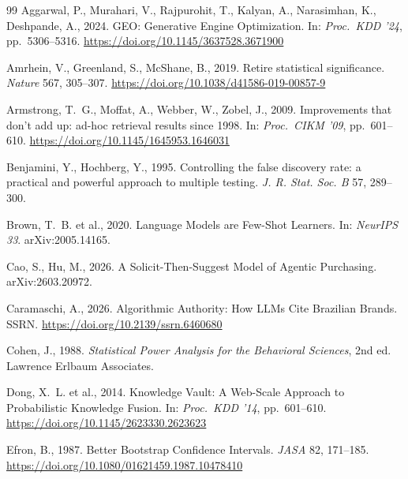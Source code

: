 \documentclass[preprint,12pt,authoryear]{elsarticle}
\begin{document}
\begin{thebibliography}{99}
Aggarwal, P., Murahari, V., Rajpurohit, T., Kalyan, A., Narasimhan, K., Deshpande, A., 2024. GEO: Generative Engine Optimization. In: \textit{Proc.\ KDD '24}, pp.~5306--5316. \url{https://doi.org/10.1145/3637528.3671900}

Amrhein, V., Greenland, S., McShane, B., 2019. Retire statistical significance. \textit{Nature} 567, 305--307. \url{https://doi.org/10.1038/d41586-019-00857-9}

Armstrong, T.~G., Moffat, A., Webber, W., Zobel, J., 2009. Improvements that don't add up: ad-hoc retrieval results since 1998. In: \textit{Proc.\ CIKM '09}, pp.~601--610. \url{https://doi.org/10.1145/1645953.1646031}

Benjamini, Y., Hochberg, Y., 1995. Controlling the false discovery rate: a practical and powerful approach to multiple testing. \textit{J. R. Stat. Soc. B} 57, 289--300.

Brown, T.~B. et al., 2020. Language Models are Few-Shot Learners. In: \textit{NeurIPS 33}. arXiv:2005.14165.

Cao, S., Hu, M., 2026. A Solicit-Then-Suggest Model of Agentic Purchasing. arXiv:2603.20972.

Caramaschi, A., 2026. Algorithmic Authority: How LLMs Cite Brazilian Brands. SSRN. \url{https://doi.org/10.2139/ssrn.6460680}

Cohen, J., 1988. \textit{Statistical Power Analysis for the Behavioral Sciences}, 2nd ed. Lawrence Erlbaum Associates.

Dong, X.~L. et al., 2014. Knowledge Vault: A Web-Scale Approach to Probabilistic Knowledge Fusion. In: \textit{Proc.\ KDD '14}, pp.~601--610. \url{https://doi.org/10.1145/2623330.2623623}

Efron, B., 1987. Better Bootstrap Confidence Intervals. \textit{JASA} 82, 171--185. \url{https://doi.org/10.1080/01621459.1987.10478410}


\end{thebibliography}
\end{document}
